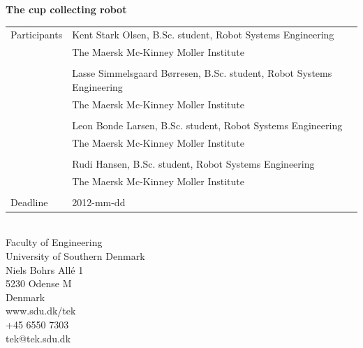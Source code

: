 \begin{titlepage}
\textsf{\Large{\textbf{\textcolor{FrontpageHeadingColor}{The cup collecting robot}}}}\\
\vspace{1.0cm}
\setlength{\extrarowheight}{1.5pt}
\begin{tabular}{@{}l l}
	\textsf{\large{Participants}} & \textsf{\large{Kent Stark Olsen, B.Sc. student, Robot Systems Engineering}}\\
	& \textsf{\large{The Maersk Mc-Kinney Moller Institute}}\\
	\\
	& \textsf{\large{Lasse Simmelsgaard Børresen, B.Sc. student, Robot Systems Engineering}}\\
	& \textsf{\large{The Maersk Mc-Kinney Moller Institute}}\\
	\\
	& \textsf{\large{Leon Bonde Larsen, B.Sc. student, Robot Systems Engineering}}\\
	& \textsf{\large{The Maersk Mc-Kinney Moller Institute}}\\
	\\
	& \textsf{\large{Rudi Hansen, B.Sc. student, Robot Systems Engineering}}\\
	& \textsf{\large{The Maersk Mc-Kinney Moller Institute}}\\
	\\
	\textsf{\large{Deadline}} & \textsf{\large{2012-mm-dd}}
\end{tabular}
\vfill
\textsf{\\Faculty of Engineering\\
University of Southern Denmark\\
Niels Bohrs Allé 1\\
5230 Odense M\\
Denmark}
\vspace*{10pt}
\\
\textsf{www.sdu.dk/tek\\
+45 6550 7303\\
tek@tek.sdu.dk}
\end{titlepage}